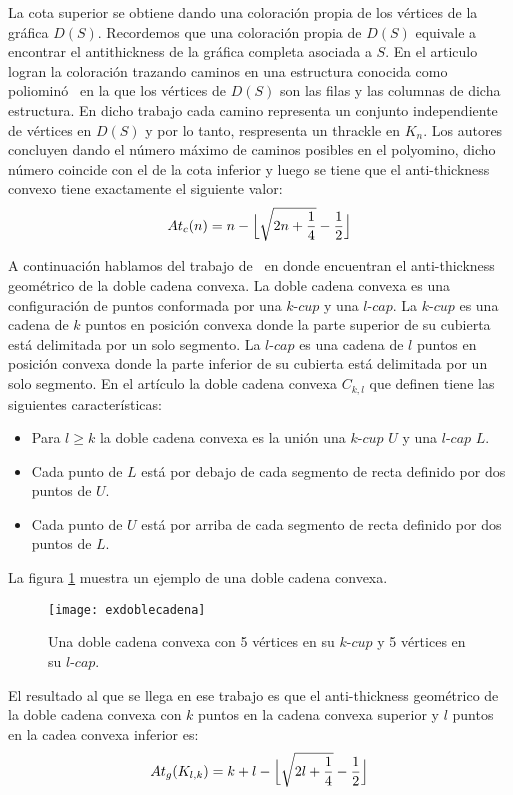 La cota superior se obtiene dando una coloración propia de los vértices de la gráfica
$D(S)$. Recordemos que una coloración propia de $D(S)$ equivale a encontrar el
antithickness de la gráfica completa asociada a $S$.
En el articulo logran la coloración trazando caminos en una
estructura conocida como poliominó~\cite{Fabila-Monroy2018-poly}
en la que los vértices de $D(S)$ son las filas y las columnas de dicha estructura.
En dicho trabajo cada camino representa un conjunto independiente de vértices en
 $D(S)$ y por lo tanto, respresenta un thrackle en $K_n$.
Los autores concluyen dando el número máximo de caminos posibles en el
polyomino, dicho número coincide con el de la cota inferior y luego se tiene
que el anti-thickness convexo tiene exactamente el siguiente valor:
\[ At_c(n) = n - \Bigl\lfloor \sqrt{2n + \frac{1}{4}} - \frac{1}{2} \Bigr\rfloor \]

A continuación hablamos del trabajo de~\cite{Lomeli2018} en donde encuentran el
anti-thickness geométrico de la doble cadena convexa. La doble cadena convexa
es una configuración de puntos conformada por una $k\text{-}cup$ y una
$l\text{-}cap$. La $k\text{-}cup$ es una cadena de $k$ puntos en posición
convexa donde la parte superior de su cubierta está delimitada por un solo
segmento. La $l\text{-}cap$ es una cadena de $l$ puntos en posición convexa
donde la parte inferior de su cubierta está delimitada por un solo segmento. En
el artículo la doble cadena convexa $C_{k,l}$ que definen tiene las siguientes
características:
\begin{itemize}
  \item Para $l\geq k$ la doble cadena convexa es la unión una $k\text{-}cup$ $U$ y una $l\text{-}cap$ $L$.
  \item Cada punto de $L$ está por debajo de cada segmento de recta definido por dos puntos de $U$.
  \item Cada punto de $U$ está por arriba de cada segmento de recta definido por dos puntos de $L$.
\end{itemize}

La figura \ref{fig:exdoblecadena} muestra un ejemplo de una doble cadena
convexa.
\begin{figure}[htpb]
  \centering
  \texttt{[image: exdoblecadena]}
  \caption{Una doble cadena convexa con 5 vértices en su $k\text{-}cup$ y 5 vértices en su $l\text{-}cap$.}
  \label{fig:exdoblecadena}
\end{figure}

El resultado al que se llega en ese trabajo es que el anti-thickness geométrico
de la doble cadena convexa con $k$ puntos en la cadena convexa superior
y $l$ puntos en la cadea convexa inferior es:
 \[At_g(K_{l,k}) = k+l-\Bigl\lfloor \sqrt{2l+\frac{1}{4}} - \frac{1}{2} \Bigr\rfloor\]

